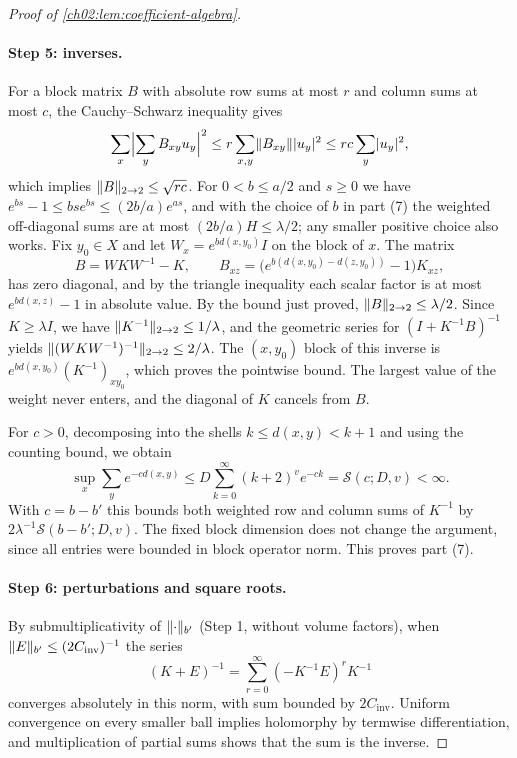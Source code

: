 \begin{proof}[Proof of \cref{ch02:lem:coefficient-algebra}]
\paragraph{Step 5: inverses.} For a block matrix $B$ with absolute row sums at most $r$ and column sums at most $c$, the Cauchy--Schwarz inequality gives
\[
 \sum_x\Bigl|\sum_yB_{xy}u_y\Bigr|^2\le r\sum_{x,y}\lVert B_{xy}\rVert\lvert u_y\rvert^2\le rc\sum_y\lvert u_y\rvert^2,
\]
which implies $\lVert B\rVert_{2\to2}\le\sqrt{rc}$. For $0<b\le a/2$ and $s\ge0$ we have $e^{bs}-1\le bse^{bs}\le(2b/a)e^{as}$, and with the choice of $b$ in part (7) the weighted off-diagonal sums are at most $(2b/a)H\le\lambda/2$; any smaller positive choice also works. Fix $y_0\in X$ and let $W_x=e^{bd(x,y_0)}I$ on the block of $x$. The matrix
\[
 B=WKW^{-1}-K,\qquad B_{xz}=\bigl(e^{b(d(x,y_0)-d(z,y_0))}-1\bigr)K_{xz},
\]
has zero diagonal, and by the triangle inequality each scalar factor is at most $e^{bd(x,z)}-1$ in absolute value. By the bound just proved, $\lVert B\rVert_{2\to2}\le\lambda/2$. Since $K\ge\lambda I$, we have $\lVert K^{-1}\rVert_{2\to2}\le1/\lambda$, and the geometric series for $(I+K^{-1}B)^{-1}$ yields $\lVert (WKW^{-1})^{-1}\rVert_{2\to2}\le2/\lambda$. The $(x,y_0)$ block of this inverse is $e^{bd(x,y_0)}(K^{-1})_{xy_0}$, which proves the pointwise bound. The largest value of the weight never enters, and the diagonal of $K$ cancels from $B$.

For $c>0$, decomposing into the shells $k\le d(x,y)<k+1$ and using the counting bound, we obtain
\begin{equation}\label{ch02:eq:exponential-count}
 \sup_x\sum_ye^{-cd(x,y)}\le D\sum_{k=0}^\infty(k+2)^ve^{-ck}=\mathcal S(c;D,v)<\infty.
\end{equation}
With $c=b-b'$ this bounds both weighted row and column sums of $K^{-1}$ by $2\lambda^{-1}\mathcal S(b-b';D,v)$. The fixed block dimension does not change the argument, since all entries were bounded in block operator norm. This proves part (7).

\paragraph{Step 6: perturbations and square roots.} By submultiplicativity of $\lVert \cdot\rVert_{b'}$ (Step 1, without volume factors), when $\lVert E\rVert_{b'}\le(2C_{\mathrm{inv}})^{-1}$ the series
\begin{equation}\label{ch02:eq:weighted-neumann}
 (K+E)^{-1}=\sum_{r=0}^\infty(-K^{-1}E)^rK^{-1}
\end{equation}
converges absolutely in this norm, with sum bounded by $2C_{\mathrm{inv}}$. Uniform convergence on every smaller ball implies holomorphy by termwise differentiation, and multiplication of partial sums shows that the sum is the inverse.


\end{proof}
